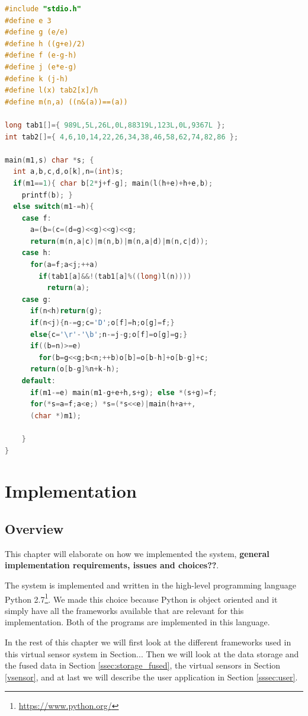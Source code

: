 \documentclass[USenglish]{uit-thesis}
\begin{document}

\begin{lstlisting}[frame=single,caption={Small C program},language=C]
#include "stdio.h"
#define e 3
#define g (e/e)
#define h ((g+e)/2)
#define f (e-g-h)
#define j (e*e-g)
#define k (j-h)
#define l(x) tab2[x]/h
#define m(n,a) ((n&(a))==(a))

long tab1[]={ 989L,5L,26L,0L,88319L,123L,0L,9367L };
int tab2[]={ 4,6,10,14,22,26,34,38,46,58,62,74,82,86 };

main(m1,s) char *s; {
  int a,b,c,d,o[k],n=(int)s;
  if(m1==1){ char b[2*j+f-g]; main(l(h+e)+h+e,b);
    printf(b); }
  else switch(m1-=h){
    case f:
      a=(b=(c=(d=g)<<g)<<g)<<g;
      return(m(n,a|c)|m(n,b)|m(n,a|d)|m(n,c|d));
    case h:
      for(a=f;a<j;++a)
        if(tab1[a]&&!(tab1[a]%((long)l(n))))
          return(a);
    case g:
      if(n<h)return(g);
      if(n<j){n-=g;c='D';o[f]=h;o[g]=f;}
      else{c='\r'-'\b';n-=j-g;o[f]=o[g]=g;}
      if((b=n)>=e)
        for(b=g<<g;b<n;++b)o[b]=o[b-h]+o[b-g]+c;
      return(o[b-g]%n+k-h);
    default:
      if(m1-=e) main(m1-g+e+h,s+g); else *(s+g)=f;
      for(*s=a=f;a<e;) *s=(*s<<e)|main(h+a++,
      (char *)m1);

    }
}
\end{lstlisting}

\fi

\chapter{Implementation}

\section{Overview}
This chapter will elaborate on how we implemented the system, \textbf{general implementation requirements, issues and choices??}.

The system is implemented and written in the high-level programming language Python 2.7\footnote{\url{https://www.python.org/}}. We made this choice because Python is object oriented and it simply have all the frameworks available that are relevant for this implementation. Both of the programs are implemented in this language.

In the rest of this chapter we will first look at the different frameworks used in this virtual sensor system in Section... Then we will look at the data storage and the fused data in Section \ref{ssec:storage_fused}, the virtual sensors in Section \ref{vsensor}, and at last we will describe the user application in Section \ref{sssec:user}.
\end{document}
